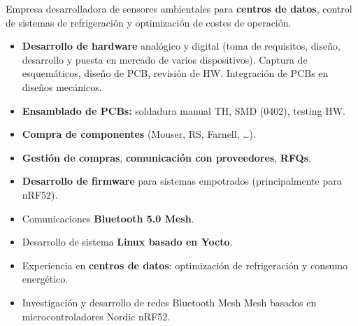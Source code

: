 \documentclass[10pt,a4paper,ragged2e,withhyper]{altacv}
\begin{document}
\begin{paracol}{2}



Empresa desarrolladora de sensores ambientales para \textbf{centros de datos}, control de sistemas de refrigeración y optimización de costes de operación.

\begin{itemize}
\item \textbf{Desarrollo de hardware} analógico y digital (toma de requisitos, diseño, desarrollo y puesta en mercado de varios dispositivos). Captura de esquemáticos, diseño de PCB, revisión de HW. Integración de PCBs en diseños mecánicos.
\item \textbf{Ensamblado de PCBs:} soldadura manual TH, SMD (0402), testing HW.
\item \textbf{Compra de componentes} (Mouser, RS, Farnell, …).
\item \textbf{Gestión de compras}, \textbf{comunicación con proveedores}, \textbf{RFQs}.
\item \textbf{Desarrollo de firmware} para sistemas empotrados (principalmente para nRF52).
\item Comunicaciones \textbf{Bluetooth 5.0 Mesh}.
\item Desarrollo de sistema \textbf{Linux basado en Yocto}.
\item Experiencia en \textbf{centros de datos}: optimización de refrigeración y consumo energético.
\end{itemize}

\divider

\begin{itemize}
\item Investigación y desarrollo de redes Bluetooth Mesh Mesh basados en microcontroladores Nordic nRF52.
\end{itemize}




\end{paracol}
\end{document}
